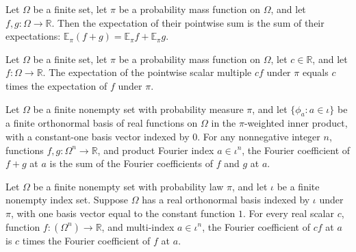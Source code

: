 \begin{theorem}
\label{FABL.pmfExpectation_add_fun}
\leanok
{}
Let $\Omega$ be a finite set, let $\pi$ be a probability mass function on $\Omega$, and
let $f,g:\Omega\to\mathbb R$. Then the expectation of their pointwise sum is the sum of
their expectations: $\mathbb E_\pi(f+g)=\mathbb E_\pi f+\mathbb E_\pi g$.
\end{theorem}

\begin{theorem}
\label{FABL.pmfExpectation_smul_fun}
\leanok
{}
Let $\Omega$ be a finite set, let $\pi$ be a probability mass function on $\Omega$, let
$c\in\mathbb{R}$, and let $f:\Omega\to\mathbb{R}$. The expectation of the pointwise
scalar multiple $cf$ under $\pi$ equals $c$ times the expectation of $f$ under $\pi$.
\end{theorem}

\begin{theorem}
\label{FABL.FiniteFourierBasis.fourierCoeff_add}
\leanok
{}
Let $\Omega$ be a finite nonempty set with probability measure $\pi$, and let
$\{\phi_a:a\in\iota\}$ be a finite orthonormal basis of real functions on $\Omega$ in
the $\pi$-weighted inner product, with a constant-one basis vector indexed by $0$. For
any nonnegative integer $n$, functions $f,g:\Omega^n\to\mathbb R$, and product Fourier
index $a\in\iota^n$, the Fourier coefficient of $f+g$ at $a$ is the sum of the Fourier
coefficients of $f$ and $g$ at $a$.
\end{theorem}

\begin{theorem}
\label{FABL.FiniteFourierBasis.fourierCoeff_smul}
\leanok
{}
Let $\Omega$ be a finite nonempty set with probability law $\pi$, and let $\iota$ be a
finite nonempty index set. Suppose $\Omega$ has a real orthonormal basis indexed by
$\iota$ under $\pi$, with one basis vector equal to the constant function $1$. For every
real scalar $c$, function $f:(\Omega^n)\to\mathbb R$, and multi-index $a\in\iota^n$, the
Fourier coefficient of $cf$ at $a$ is $c$ times the Fourier coefficient of $f$ at $a$.
\end{theorem}

